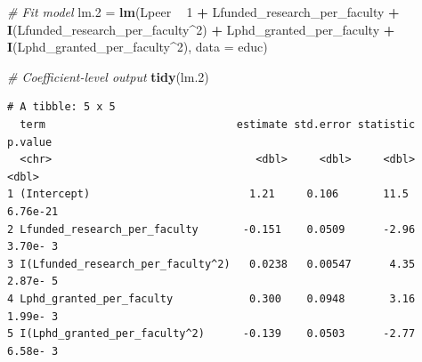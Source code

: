 \documentclass[]{book}
\newenvironment{Shaded}{\begin{snugshade}}{\end{snugshade}}
\newcommand{\CommentTok}[1]{\textcolor[rgb]{0.56,0.35,0.01}{\textit{#1}}}
\newcommand{\DataTypeTok}[1]{\textcolor[rgb]{0.13,0.29,0.53}{#1}}
\newcommand{\DecValTok}[1]{\textcolor[rgb]{0.00,0.00,0.81}{#1}}
\newcommand{\FloatTok}[1]{\textcolor[rgb]{0.00,0.00,0.81}{#1}}
\newcommand{\KeywordTok}[1]{\textcolor[rgb]{0.13,0.29,0.53}{\textbf{#1}}}
\newcommand{\NormalTok}[1]{#1}
\newcommand{\OperatorTok}[1]{\textcolor[rgb]{0.81,0.36,0.00}{\textbf{#1}}}
\newcommand{\StringTok}[1]{\textcolor[rgb]{0.31,0.60,0.02}{#1}}
\begin{document}
\begin{Shaded}
\begin{Highlighting}[]
\CommentTok{# Fit model}
\NormalTok{lm}\FloatTok{.2}\NormalTok{ =}\StringTok{ }\KeywordTok{lm}\NormalTok{(Lpeer }\OperatorTok{~}\StringTok{ }\DecValTok{1} \OperatorTok{+}\StringTok{ }\NormalTok{Lfunded_research_per_faculty }\OperatorTok{+}\StringTok{ }\KeywordTok{I}\NormalTok{(Lfunded_research_per_faculty}\OperatorTok{^}\DecValTok{2}\NormalTok{) }\OperatorTok{+}\StringTok{ }\NormalTok{Lphd_granted_per_faculty  }\OperatorTok{+}\StringTok{ }\KeywordTok{I}\NormalTok{(Lphd_granted_per_faculty}\OperatorTok{^}\DecValTok{2}\NormalTok{), }\DataTypeTok{data =}\NormalTok{ educ)}

\CommentTok{# Coefficient-level output}
\KeywordTok{tidy}\NormalTok{(lm}\FloatTok{.2}\NormalTok{)}
\end{Highlighting}
\end{Shaded}

\begin{verbatim}
# A tibble: 5 x 5
  term                              estimate std.error statistic  p.value
  <chr>                                <dbl>     <dbl>     <dbl>    <dbl>
1 (Intercept)                         1.21     0.106       11.5  6.76e-21
2 Lfunded_research_per_faculty       -0.151    0.0509      -2.96 3.70e- 3
3 I(Lfunded_research_per_faculty^2)   0.0238   0.00547      4.35 2.87e- 5
4 Lphd_granted_per_faculty            0.300    0.0948       3.16 1.99e- 3
5 I(Lphd_granted_per_faculty^2)      -0.139    0.0503      -2.77 6.58e- 3
\end{verbatim}

\begin{Shaded}
\end{Shaded}
\end{document}
